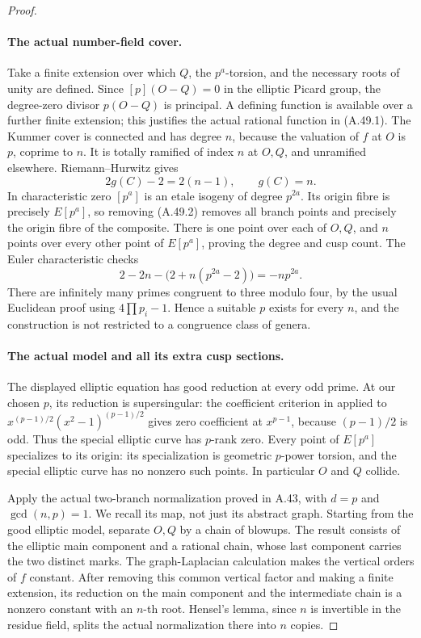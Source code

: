 \begin{proof}
\paragraph{The actual number-field cover.}
Take a finite extension over which \(Q\), the
\(p^a\)-torsion, and the necessary roots of unity
are defined. Since \([p](O-Q)=0\) in the
elliptic Picard group, the degree-zero divisor
\(p(O-Q)\) is principal. A defining function is
available over a further finite extension; this
justifies the actual rational function in (A.49.1).
The Kummer cover is connected and has degree \(n\),
because the valuation of \(f\) at \(O\) is
\(p\), coprime to \(n\). It is totally ramified
of index \(n\) at \(O,Q\), and unramified
elsewhere. Riemann--Hurwitz gives
\[
                       2g(C)-2=2(n-1),
                      \qquad g(C)=n.                \tag{A.49.3}
\]
In characteristic zero \([p^a]\) is an etale
isogeny of degree \(p^{2a}\). Its origin fibre
is precisely \(E[p^a]\), so removing (A.49.2)
removes all branch points and precisely the origin
fibre of the composite. There is one point over
each of \(O,Q\), and \(n\) points over every
other point of \(E[p^a]\), proving the degree
and cusp count. The Euler characteristic checks
\[
       2-2n-\bigl(2+n(p^{2a}-2)\bigr)=-np^{2a}.
                                                               \tag{A.49.4}
\]
There are infinitely many primes congruent to three
modulo four, by the usual Euclidean proof using
\(4\prod p_i-1\). Hence a suitable \(p\)
exists for every \(n\), and the construction is
not restricted to a congruence class of genera.

\paragraph{The actual model and all its extra cusp sections.}
The displayed elliptic equation has good reduction
at every odd prime. At our chosen \(p\), its
reduction is supersingular: the coefficient criterion
in \cite[Theorem V.4.1(a) and Example V.4.5]{fghSilvermanAEC}
applied to
\(x^{(p-1)/2}(x^2-1)^{(p-1)/2}\) gives zero
coefficient at \(x^{p-1}\), because
\((p-1)/2\) is odd. Thus the special elliptic
curve has \(p\)-rank zero. Every point of
\(E[p^a]\) specializes to its origin: its
specialization is geometric \(p\)-power torsion,
and the special elliptic curve has no nonzero such
points. In particular \(O\) and \(Q\) collide.

Apply the actual two-branch normalization proved in
A.43, with \(d=p\) and \(\gcd(n,p)=1\).
We recall its map, not just its abstract graph.
Starting from the good elliptic model, separate
\(O,Q\) by a chain of blowups. The result consists
of the elliptic main component and a rational chain,
whose last component carries the two distinct marks.
The graph-Laplacian calculation makes the vertical
orders of \(f\) constant. After removing this
common vertical factor and making a finite extension,
its reduction on the main component and the
intermediate chain is a nonzero constant with an
\(n\)-th root. Hensel's lemma, since \(n\) is
invertible in the residue field, splits the actual
normalization there into \(n\) copies.


\end{proof}
